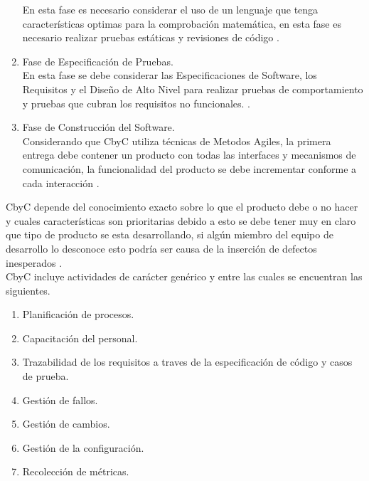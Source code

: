 \documentclass[runningheads,a4paper]{llncs}
\begin{document}
\begin{enumerate}
En esta fase es necesario considerar el uso de un lenguaje que tenga características optimas para la comprobación matemática, en esta fase es necesario realizar pruebas estáticas y revisiones de código  \cite{CbyCBrito}.\\
		  
		  \item Fase de Especificación de Pruebas.\\
		  
En esta fase se debe considerar las Especificaciones de \gls{Software}, los Requisitos y el Diseño de Alto Nivel para realizar pruebas de comportamiento y pruebas que cubran los requisitos no funcionales. \cite{CbyCBrito}.\\
		  
		  \item Fase de Construcción del \gls{Software}.\\
		  
Considerando que \gls{CbyC} utiliza técnicas de \gls{Metodos Agiles}, la primera entrega debe 				contener un producto con todas las interfaces y mecanismos de comunicación, la funcionalidad del 			  producto se debe incrementar conforme a cada interacción \cite{CbyCBrito}.
		  
\end{enumerate}
\gls{CbyC} depende del conocimiento exacto sobre lo que el producto debe o no hacer y cuales características son prioritarias debido a esto se debe tener muy en claro que tipo de producto se esta desarrollando, si algún miembro del equipo de desarrollo lo desconoce esto podría ser causa de la inserción de defectos inesperados \cite{CbyCComercialSystem}.\\

CbyC incluye actividades de carácter genérico y entre las cuales se encuentran las siguientes.

\begin{enumerate}
	\item Planificación de procesos.
	\item Capacitación del personal.
	\item Trazabilidad de los requisitos a traves de la especificación de código y casos de prueba.
	\item Gestión de fallos.
	\item Gestión de cambios.
	\item Gestión de la configuración.
	\item Recolección de métricas.
\end{enumerate} 
\end{document}
